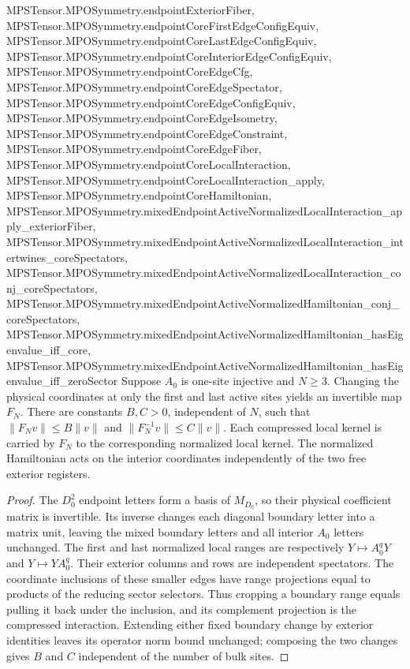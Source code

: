 \begin{lemma}
{        MPSTensor.MPOSymmetry.endpointExteriorFiber,
        MPSTensor.MPOSymmetry.endpointCoreFirstEdgeConfigEquiv,
        MPSTensor.MPOSymmetry.endpointCoreLastEdgeConfigEquiv,
        MPSTensor.MPOSymmetry.endpointCoreInteriorEdgeConfigEquiv,
        MPSTensor.MPOSymmetry.endpointCoreEdgeCfg,
        MPSTensor.MPOSymmetry.endpointCoreEdgeSpectator,
        MPSTensor.MPOSymmetry.endpointCoreEdgeConfigEquiv,
        MPSTensor.MPOSymmetry.endpointCoreEdgeIsometry,
        MPSTensor.MPOSymmetry.endpointCoreEdgeConstraint,
        MPSTensor.MPOSymmetry.endpointCoreEdgeFiber,
        MPSTensor.MPOSymmetry.endpointCoreLocalInteraction,
        MPSTensor.MPOSymmetry.endpointCoreLocalInteraction_apply,
        MPSTensor.MPOSymmetry.endpointCoreHamiltonian,
        MPSTensor.MPOSymmetry.mixedEndpointActiveNormalizedLocalInteraction_apply_exteriorFiber,
        MPSTensor.MPOSymmetry.mixedEndpointActiveNormalizedLocalInteraction_intertwines_coreSpectators,
        MPSTensor.MPOSymmetry.mixedEndpointActiveNormalizedLocalInteraction_conj_coreSpectators,
        MPSTensor.MPOSymmetry.mixedEndpointActiveNormalizedHamiltonian_conj_coreSpectators,
        MPSTensor.MPOSymmetry.mixedEndpointActiveNormalizedHamiltonian_hasEigenvalue_iff_core,
        MPSTensor.MPOSymmetry.mixedEndpointActiveNormalizedHamiltonian_hasEigenvalue_iff_zeroSector}
    \leanok
    Suppose $A_0$ is one-site injective and $N\geq3$. Changing
    the physical coordinates at only the first and last active sites
    yields an invertible map $F_N$. There are constants $B,C>0$,
    independent of $N$, such that
    $\|F_Nv\|\leq B\|v\|$ and $\|F_N^{-1}v\|\leq C\|v\|$.
    Each compressed local kernel is carried by $F_N$ to the
    corresponding normalized local kernel. The normalized Hamiltonian
    acts on the interior coordinates independently of the two free
    exterior registers.
\end{lemma}
\begin{proof}
    \leanok
    The $D_0^2$ endpoint letters form a basis of $M_{D_0}$, so their
    physical coefficient matrix is invertible. Its inverse changes
    each diagonal boundary letter into a matrix unit, leaving the mixed
    boundary letters and all interior $A_0$ letters unchanged. The
    first and last normalized local ranges are respectively
    $Y\mapsto A_0^qY$ and $Y\mapsto YA_0^q$.
    Their exterior columns and rows are independent spectators.
    The coordinate inclusions of these smaller edges have range
    projections equal to products of the reducing sector selectors.
    Thus cropping a boundary range equals pulling it back under the
    inclusion, and its complement projection is the compressed
    interaction. Extending either fixed boundary change by exterior
    identities leaves its operator norm bound unchanged; composing the
    two changes gives $B$ and $C$ independent of the number of bulk sites.
\end{proof}

